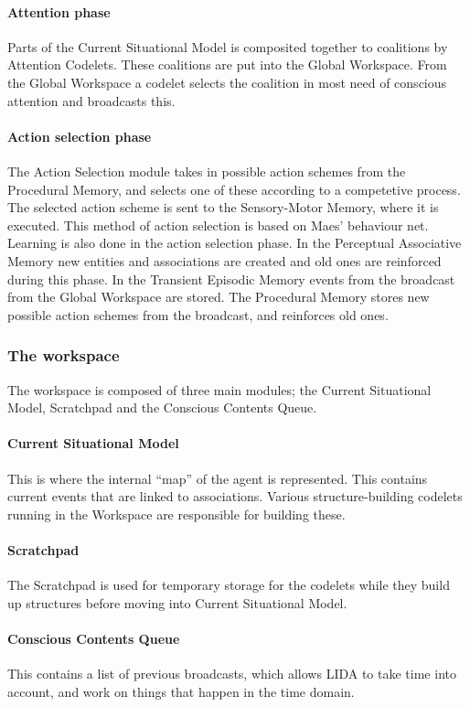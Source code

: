\paragraph{Attention phase}
Parts of the Current Situational Model is composited together to coalitions by
Attention Codelets. These coalitions are put into the Global Workspace.
From the Global Workspace a codelet selects the coalition in most need of
conscious attention and broadcasts this.
\paragraph{Action selection phase}
The Action Selection module takes in possible action schemes from the Procedural Memory, and selects one of these according to a competetive process. The selected action scheme is sent to the Sensory-Motor Memory, where it is executed. This method of action selection is based on Maes' behaviour net.\cite{maes1989right} Learning is also done in the action selection phase. In the Perceptual Associative Memory new entities and associations are created and old ones are reinforced during this phase. In the Transient Episodic Memory events from the broadcast from the Global Workspace are stored. The Procedural Memory stores new possible action schemes from the broadcast, and reinforces old ones.


\subsubsection{The workspace}
The workspace is composed of three main modules; the Current Situational Model,
Scratchpad and the Conscious Contents Queue.
\paragraph{Current Situational Model} This is where the internal ``map'' of the
agent is represented. This contains current events that are linked to
associations. Various structure-building codelets running in the Workspace are
responsible for building these.
\paragraph{Scratchpad} The Scratchpad is used for temporary storage for the
codelets while they build up structures before moving into Current Situational
Model.
\paragraph{Conscious Contents Queue}
This contains a list of previous broadcasts, which allows LIDA to take time
into account, and work on things that happen in the time domain.

